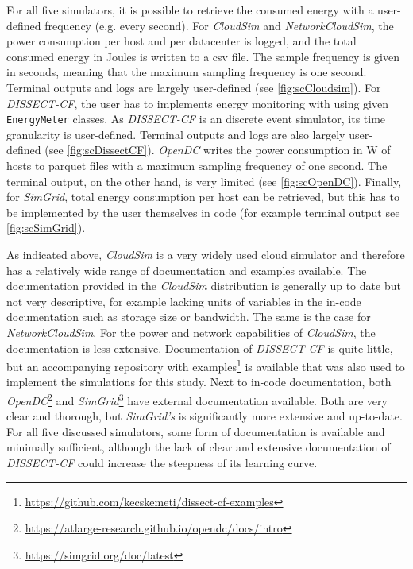 For all five simulators, it is possible to retrieve the consumed energy with a user-defined frequency (e.g. every second). For \textit{CloudSim} and \textit{NetworkCloudSim}, the power consumption per host and per datacenter is logged, and the total consumed energy in Joules is written to a csv file.  The sample frequency is given in seconds, meaning that the maximum sampling frequency is one second. Terminal outputs and logs are largely user-defined (see \autoref{fig:scCloudsim}). For \textit{DISSECT-CF}, the user has to implements energy monitoring with using given \verb|EnergyMeter| classes. As \textit{DISSECT-CF} is an discrete event simulator, its time granularity is user-defined. Terminal outputs and logs are also largely user-defined (see \autoref{fig:scDissectCF}). \textit{OpenDC} writes the power consumption in W of hosts to parquet files with a maximum sampling frequency of one second. The terminal output, on the other hand, is very limited (see \autoref{fig:scOpenDC}). Finally, for \textit{SimGrid}, total energy consumption per host can be retrieved, but this has to be implemented by the user themselves in code (for example terminal output see \autoref{fig:scSimGrid}).

As indicated above, \textit{CloudSim} is a very widely used cloud simulator and therefore has a relatively wide range of documentation and examples available. The documentation provided in the \textit{CloudSim} distribution is generally up to date but not very descriptive, for example lacking units of variables in the in-code documentation such as storage size or bandwidth. The same is the case for \textit{NetworkCloudSim}. For the power and network capabilities of \textit{CloudSim}, the documentation is less extensive. Documentation of \textit{DISSECT-CF} is quite little, but an accompanying repository with examples\footnote{\url{https://github.com/kecskemeti/dissect-cf-examples}} is available that was also used to implement the simulations for this study. Next to in-code documentation, both \textit{OpenDC}\footnote{\url{https://atlarge-research.github.io/opendc/docs/intro}} and \textit{SimGrid}\footnote{\url{https://simgrid.org/doc/latest}} have external documentation available. Both are very clear and thorough, but \textit{SimGrid's} is significantly more extensive and up-to-date. For all five discussed simulators, some form of documentation is available and minimally sufficient, although the lack of clear and extensive documentation of \textit{DISSECT-CF} could increase the steepness of its learning curve.

